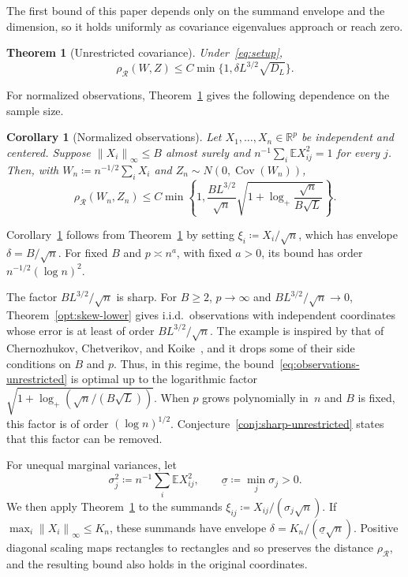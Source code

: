 \documentclass[11pt,letterpaper]{article}
\newtheorem{theorem}{Theorem}
\newtheorem{corollary}{Corollary}
\theoremstyle{remark}
\newcommand{\E}{\mathbb E}
\newcommand{\R}{\mathbb R}
\newcommand{\Cov}{\operatorname{Cov}}
\newcommand{\norm}[1]{\left\lVert#1\right\rVert}
\newcommand{\rh}{\rho_{\mathcal R}}
\begin{document}
The first bound of this paper depends only on the summand envelope and the
dimension, so it holds uniformly as covariance eigenvalues approach or
reach zero.

\begin{theorem}[Unrestricted covariance]\label{thm:unrestricted}
Under~\eqref{eq:setup},
\begin{equation}
 \rh(W,Z)\le C\min\{1,\delta L^{3/2}\sqrt{D_L}\}.
 \label{eq:unrestricted}
\end{equation}
\end{theorem}

For normalized observations, Theorem~\ref{thm:unrestricted} gives
the following dependence on the sample size.

\begin{corollary}[Normalized observations]\label{cor:observations}
Let \(X_1,\ldots,X_n\in\R^p\) be independent and centered. Suppose
\(\norm{X_i}_\infty\le B\) almost surely and
\(n^{-1}\sum_i\E X_{ij}^2=1\) for every \(j\). Then, with
\(W_n\coloneqq n^{-1/2}\sum_iX_i\) and \(Z_n\sim N(0,\Cov(W_n))\),
\begin{equation}
 \rh(W_n,Z_n)\le C\min\!\left\{1,
 \frac{B L^{3/2}}{\sqrt n}
 \sqrt{1+\log_+\frac{\sqrt n}{B\sqrt L}}\right\}.
 \label{eq:observations-unrestricted}
\end{equation}
\end{corollary}

Corollary~\ref{cor:observations} follows from Theorem~\ref{thm:unrestricted}
by setting \(\xi_i\coloneqq X_i/\sqrt n\), which has envelope \(\delta=B/\sqrt n\). For
fixed \(B\) and \(p\asymp n^a\), with fixed \(a>0\), its bound has
order \(n^{-1/2}(\log n)^2\).

The factor \(BL^{3/2}/\sqrt n\) is sharp. For \(B\ge2\), \(p\to\infty\) and
\(BL^{3/2}/\sqrt n\to0\), Theorem~\ref{opt:skew-lower} gives i.i.d.\ observations
with independent coordinates whose error is at least of order
\(BL^{3/2}/\sqrt n\). The example is inspired by that of Chernozhukov,
Chetverikov, and Koike~\cite[Proposition~2.1]{CCK}, and it drops some of their
side conditions on \(B\) and \(p\). Thus, in this regime, the
bound~\eqref{eq:observations-unrestricted} is optimal up to the logarithmic
factor \(\sqrt{1+\log_+(\sqrt n/(B\sqrt L))}\). When \(p\) grows polynomially
in~\(n\) and \(B\) is fixed, this factor is of order \((\log n)^{1/2}\).
Conjecture~\ref{conj:sharp-unrestricted} states that this factor can be removed.

For unequal marginal variances, let
\[
 \sigma_j^2\coloneqq n^{-1}\sum_i\E X_{ij}^2,
 \qquad
 \underline\sigma\coloneqq \min_j\sigma_j>0.
\]
We then apply Theorem~\ref{thm:unrestricted} to the summands
\(\xi_{ij}\coloneqq X_{ij}/(\sigma_j\sqrt n)\). If
\(\max_i\norm{X_i}_\infty\le K_n\), these summands have
envelope \(\delta=K_n/(\underline\sigma\sqrt n)\).
Positive diagonal scaling maps rectangles to rectangles and so preserves
the distance \(\rh\), and the resulting bound also holds in the
original coordinates.
\end{document}
